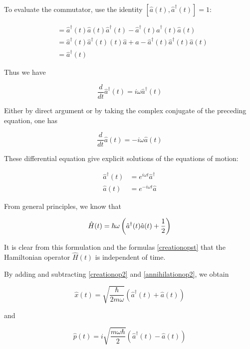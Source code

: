 To evaluate the commutator, use the identity $[\hat a(t), \hat a^\dagger(t)] = 1$:

\begin{align}
[\hat a^\dagger(t) \hat a(t), a^\dagger(t)]
 &= \hat a^\dagger(t) \hat a(t) \hat a^\dagger(t) - 
\hat a^\dagger(t) \hat a^\dagger(t) \hat a(t) \\
&= \hat a^\dagger(t) \hat a^\dagger(t)(t) \hat a
 + a - 
\hat a^\dagger(t) \hat a^\dagger(t) \hat a(t) \\
&= \hat a^\dagger(t)
\end{align}

Thus we have

\begin{equation}
\frac{d}{dt}\hat a^\dagger(t) = i\omega \hat a^\dagger(t)
\end{equation}

Either by direct argument or by taking the complex conjugate of the preceding equation, one has

\begin{equation}
\frac{d}{dt}\hat a(t) = -i\omega \hat a(t)
\end{equation}

These differential equation give explicit solutions of the equations of motion:

\begin{align}
\label{creationopst}
\hat a^\dagger(t) &= e^{i\omega t} \hat a^\dagger  \\
 \hat a(t) &= e^{-i\omega t} \hat a
\end{align}

From general principles, we know that

\begin{equation}
\hat H(t) = \hbar \omega\left(\hat a^\dagger(t)  \hat a(t) 
+ \small{\frac{1}{2}} \right)
\end{equation}

It is clear from this formulation and the formulas  \eqref{creationopst} that the Hamiltonian operator $\hat H(t)$ is independent of time.

\begin{remark}
By adding and subtracting \eqref{creationop2} and \eqref{annihilationop2}, we obtain
\end{remark}


\begin{equation}
\hat x(t) = \sqrt{\frac{\hbar}{2m\omega}}\left( \hat a^\dagger(t) + \hat a(t) \right)
\end{equation}


and


\begin{equation}
\hat p(t) = i\sqrt{\frac{m\omega\hbar}{2}}\left( \hat a^\dagger(t)  - \hat a(t) \right)
\end{equation}
